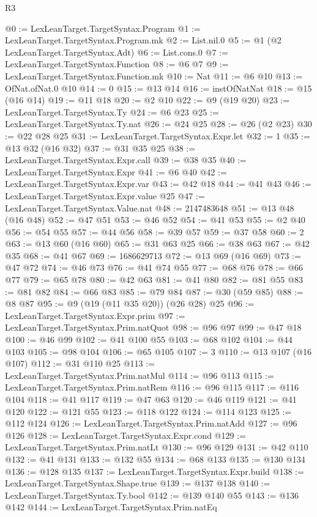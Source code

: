 \begin{lexlean}{R3}
\begin{coremodule}
@0 := LexLeanTarget.TargetSyntax.Program
@1 := LexLeanTarget.TargetSyntax.Program.mk
@2 := List.nil.{0}
@5 := @1 (@2 LexLeanTarget.TargetSyntax.Adt)
@6 := List.cons.{0}
@7 := LexLeanTarget.TargetSyntax.Function
@8 := @6 @7
@9 := LexLeanTarget.TargetSyntax.Function.mk
@10 := Nat
@11 := @6 @10
@13 := OfNat.ofNat.{0} @10
@14 := 0
@15 := @13 @14
@16 := instOfNatNat
@18 := @15 (@16 @14)
@19 := @11 @18
@20 := @2 @10
@22 := @9 (@19 @20)
@23 := LexLeanTarget.TargetSyntax.Ty
@24 := @6 @23
@25 := LexLeanTarget.TargetSyntax.Ty.nat
@26 := @24 @25
@28 := @26 (@2 @23)
@30 := @22 @28 @25
@31 := LexLeanTarget.TargetSyntax.Expr.let
@32 := 1
@35 := @13 @32 (@16 @32)
@37 := @31 @35 @25
@38 := LexLeanTarget.TargetSyntax.Expr.call
@39 := @38 @35
@40 := LexLeanTarget.TargetSyntax.Expr
@41 := @6 @40
@42 := LexLeanTarget.TargetSyntax.Expr.var
@43 := @42 @18
@44 := @41 @43
@46 := LexLeanTarget.TargetSyntax.Expr.value @25
@47 := LexLeanTarget.TargetSyntax.Value.nat
@48 := 2147483648
@51 := @13 @48 (@16 @48)
@52 := @47 @51
@53 := @46 @52
@54 := @41 @53
@55 := @2 @40
@56 := @54 @55
@57 := @44 @56
@58 := @39 @57
@59 := @37 @58
@60 := 2
@63 := @13 @60 (@16 @60)
@65 := @31 @63 @25
@66 := @38 @63
@67 := @42 @35
@68 := @41 @67
@69 := 1686629713
@72 := @13 @69 (@16 @69)
@73 := @47 @72
@74 := @46 @73
@76 := @41 @74 @55
@77 := @68 @76
@78 := @66 @77
@79 := @65 @78
@80 := @42 @63
@81 := @41 @80
@82 := @81 @55
@83 := @81 @82
@84 := @66 @83
@85 := @79 @84
@87 := @30 (@59 @85)
@88 := @8 @87
@95 := @9 (@19 (@11 @35 @20)) (@26 @28) @25
@96 := LexLeanTarget.TargetSyntax.Expr.prim
@97 := LexLeanTarget.TargetSyntax.Prim.natQuot
@98 := @96 @97
@99 := @47 @18
@100 := @46 @99
@102 := @41 @100 @55
@103 := @68 @102
@104 := @44 @103
@105 := @98 @104
@106 := @65 @105
@107 := 3
@110 := @13 @107 (@16 @107)
@112 := @31 @110 @25
@113 := LexLeanTarget.TargetSyntax.Prim.natMul
@114 := @96 @113
@115 := LexLeanTarget.TargetSyntax.Prim.natRem
@116 := @96 @115
@117 := @116 @104
@118 := @41 @117
@119 := @47 @63
@120 := @46 @119
@121 := @41 @120
@122 := @121 @55
@123 := @118 @122
@124 := @114 @123
@125 := @112 @124
@126 := LexLeanTarget.TargetSyntax.Prim.natAdd
@127 := @96 @126
@128 := LexLeanTarget.TargetSyntax.Expr.cond
@129 := LexLeanTarget.TargetSyntax.Prim.natLt
@130 := @96 @129
@131 := @42 @110
@132 := @41 @131
@133 := @132 @55
@134 := @68 @133
@135 := @130 @134
@136 := @128 @135
@137 := LexLeanTarget.TargetSyntax.Expr.build
@138 := LexLeanTarget.TargetSyntax.Shape.true
@139 := @137 @138
@140 := LexLeanTarget.TargetSyntax.Ty.bool
@142 := @139 @140 @55
@143 := @136 @142
@144 := LexLeanTarget.TargetSyntax.Prim.natEq

\end{coremodule}
\end{lexlean}
